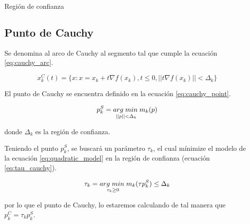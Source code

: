 \begin{algorithm}
    \caption{Región de confianza}
    \label{alg:trust_region}
\end{algorithm}

\subsection{Punto de Cauchy}

Se denomina al arco de Cauchy al segmento tal que cumple la ecuación \ref{eq:cauchy_arc}.

\begin{equation}
    x_k^C(t) = \{x: x=x_k + t\nabla f(x_k), t\leq 0, ||t\nabla f(x_k)|| < \Delta_k \}
    \label{eq:cauchy_arc}
\end{equation}

El punto de Cauchy se encuentra definido en la ecuación \ref{eq:cauchy_point}.

\begin{equation}
    p_k^S = \underset{||p||<\Delta_k}{arg\; min\;} m_k(p) \label{eq:cauchy_point}
\end{equation}

donde $\Delta_k$ es la región de confianza.

Teniendo el punto $p_k^S$, se buscará un parámetro $\tau_k$, el cual mínimize el modelo de la ecuación \ref*{eq:quadratic_model} en la región de confianza (ecuación \ref{eq:tau_cauchy}).

\begin{equation}
    \tau_k = \underset{\tau_k \geq 0}{arg\; min\;} m_k(\tau p_k^S) \leq \Delta_k \label{eq:tau_cauchy}
\end{equation}

por lo que el punto de Cauchy, lo estaremos calculando de tal manera que $p_k^C = \tau_k p_k^S$.

